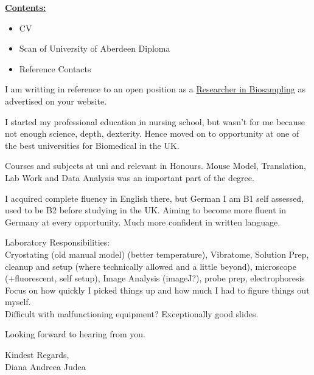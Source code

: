 \documentclass[paper=a4,fontsize=11pt]{scrartcl} %
\newcommand{\sepspace}{\vspace*{1em}}		%
\begin{document}
  \textbf{\underline{Contents:}}
  \begin{itemize}[noitemsep,topsep=0pt]
    \setlength\itemsep{1pt}
    \item CV
    \item Scan of University of Aberdeen Diploma
    \item Reference Contacts
  \end{itemize}
  
  \cleardoublepage
  
  \sepspace
  
  \noindent
  I am writting in reference to an open position as a
  \href{https://tron-mainz.de/wp-content/uploads/2021/03/Research_Scientist_Biosampling.pdf}{Researcher
  in Biosampling} as advertised on your website.
  \sepspace
  
  \noindent I started my professional education in nursing school, but wasn't
  for me because not enough science, depth, dexterity.  Hence moved on to
  opportunity at one of the best universities for Biomedical in the UK.
  \sepspace

  \noindent Courses and subjects at uni and relevant in Honours.  Mouse Model,
  Translation, Lab Work and Data Analysis was an important part of the degree.
  \sepspace
  
  \noindent I acquired complete fluency in English there, but German I am B1
  self assessed, used to be B2 before studying in the UK.  Aiming to become
  more fluent in Germany at every opportunity.  Much more confident in written
  language.
  \sepspace

  \noindent
  Laboratory Responsibilities: \\ Cryostating (old manual model)
  (better temperature), Vibratome, Solution Prep, cleanup and setup (where
  technically allowed and a little beyond), microscope (+fluorescent, self
  setup), Image Analysis (imageJ?), probe prep, electrophoresis \\ Focus on how
  quickly I picked things up and how much I had to figure things out myself. \\
  Difficult with malfunctioning equipment?  Exceptionally good slides.
  \sepspace
  
  \sepspace
  
  \noindent
  Looking forward to hearing from you.
  \sepspace
  
  \noindent
  Kindest Regards, \\
  Diana Andreea Judea
\end{document}
